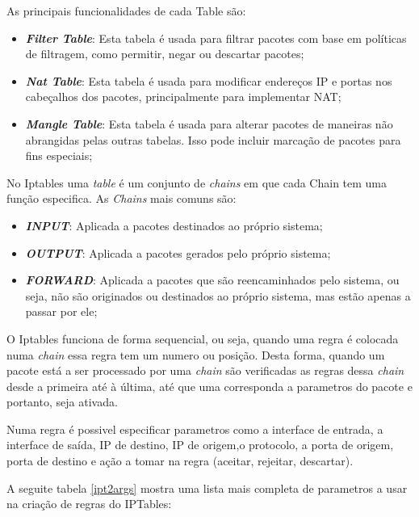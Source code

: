 As principais funcionalidades de cada Table são:

\begin{itemize}
    \item \textbf{\textit{Filter Table}}: Esta tabela é usada para filtrar pacotes com base em 
    políticas de filtragem, como permitir, negar ou descartar pacotes;
    \item \textbf{\textit{Nat Table}}: Esta tabela é usada para modificar endereços IP e portas
    nos cabeçalhos dos pacotes, principalmente para implementar NAT;
    \item \textbf{\textit{Mangle Table}}: Esta tabela é usada para alterar pacotes de maneiras
    não abrangidas pelas outras tabelas. Isso pode incluir marcação de pacotes para fins especiais;
\end{itemize}


No Iptables uma \textit{table} é um conjunto de \textit{chains} em que cada Chain tem uma função
especifica. As \textit{Chains} mais comuns são:


\begin{itemize}
    \item \textbf{\textit{INPUT}}: Aplicada a pacotes destinados ao próprio sistema;
    \item \textbf{\textit{OUTPUT}}: Aplicada a pacotes gerados pelo próprio sistema;
    \item \textbf{\textit{FORWARD}}: Aplicada a pacotes que são reencaminhados pelo
    sistema, ou seja, não são originados ou destinados ao próprio sistema,
    mas estão apenas a passar por ele;
\end{itemize}

O Iptables funciona de forma sequencial, ou seja, quando uma regra é colocada
numa \textit{chain} essa regra tem um numero ou posição. Desta forma, quando um 
pacote está a ser processado por uma \textit{chain} são verificadas as regras 
dessa \textit{chain} desde a primeira até à última, até que uma corresponda a
parametros do pacote e portanto, seja ativada.


Numa regra é possivel especificar parametros como a interface de entrada, 
a interface de saída, IP de destino, IP de origem,o protocolo, a porta de 
origem, porta de destino e ação a tomar na regra (aceitar, rejeitar, descartar).

A seguite tabela \ref{ipt2args} mostra uma lista mais completa de parametros a usar na
criação de regras do IPTables:


